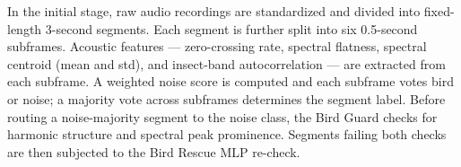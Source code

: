 \documentclass[a4paper,12pt]{article}
\begin{document}
\noindent
In the initial stage, raw audio recordings are standardized and divided into fixed-length
3-second segments. Each segment is further split into six 0.5-second subframes. Acoustic
features --- zero-crossing rate, spectral flatness, spectral centroid (mean and std), and
insect-band autocorrelation --- are extracted from each subframe. A weighted noise score is
computed and each subframe votes bird or noise; a majority vote across subframes determines
the segment label. Before routing a noise-majority segment to the noise class, the Bird Guard
checks for harmonic structure and spectral peak prominence. Segments failing both checks are
then subjected to the Bird Rescue MLP re-check.

\end{document}

